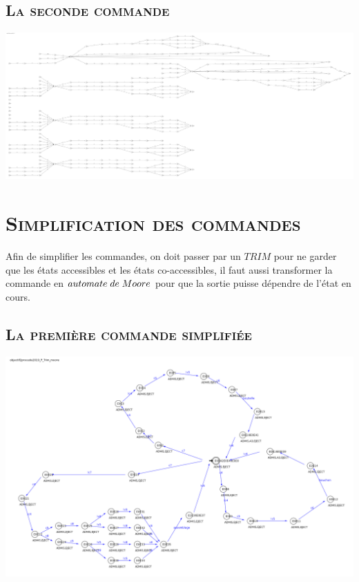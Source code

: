 		  \subsection{\textsc{La seconde commande}}
			
			\begin{center}
			\includegraphics[scale=0.07]{com2.png}
			\label{fig7}
			\end{center}		  
		  
		   \pagebreak
		 \section{\textsc{Simplification des commandes}}
		 
		 \par Afin de simplifier les commandes, on doit passer par un $TRIM$ pour ne garder que les états accessibles et les états co-accessibles, il faut aussi transformer la commande en $automate \hspace{1mm} de \hspace{1mm} Moore$ pour que la sortie puisse dépendre de l'état en cours.\\
		 
		  \subsection{\textsc{La première commande simplifiée}}
		  
		    \begin{center}
			\includegraphics[scale=0.25]{com1s.png}
			\label{fig8}
			\end{center}	
			
